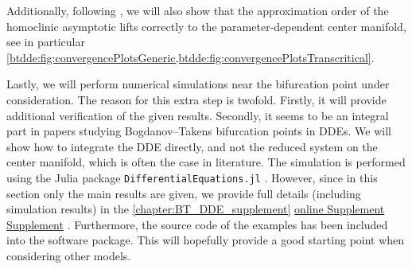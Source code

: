 Additionally, following \cite{Bosschaert@Interplay}, we will also show that the
approximation order of the homoclinic asymptotic lifts correctly to the
parameter-dependent center manifold, see in particular
\cref{btdde:fig:convergencePlotsGeneric,btdde:fig:convergencePlotsTranscritical}. 

Lastly, we will perform numerical simulations near the bifurcation point under
consideration. The reason for this extra step is twofold. Firstly, it will
provide additional verification of the given results. Secondly, it seems to be
an integral part in papers studying Bogdanov--Takens bifurcation points in
DDEs. We will show how to integrate the DDE directly, and not the reduced
system on the center manifold, which is often the case in literature. The
simulation is performed using the Julia package {\tt DifferentialEquations.jl}
\cite{rackauckas2017differentialequations}. However, since in this section only
the main results are given, we provide full details (including simulation
results) in the %
\ifthesis%
    \cref{chapter:BT_DDE_supplement}%
\fi%
\ifsiam%
    \hyperref[mysupplement]{online Supplement}%
\fi%
\ifarxiv%
    \hyperlink{mysupplement}{Supplement}%
\fi. Furthermore, the source
code of the examples has been included into the \DDEBIFTOOL software package.
This will hopefully provide a good starting point when considering other
models.

